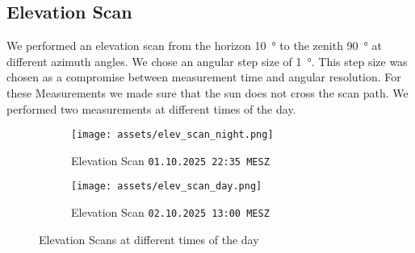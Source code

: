 \subsection{Elevation Scan}
We performed an elevation scan from the horizon \SI{10}{\degree} to the zenith \SI{90}{\degree} at different  azimuth angles.
We chose an angular step size of \SI{1}{\degree}. This step size was chosen as a compromise between measurement time and angular resolution.
For these Measurements we made sure that the sun does not cross the scan path. We performed two measurements at different times of the day.

\begin{figure}[H]
\centering
\begin{subfigure}[t]{0.45\textwidth}
    \centering
    \texttt{[image: assets/elev\_scan\_night.png]}
    \caption{Elevation Scan \texttt{01.10.2025 22:35 MESZ}}
\end{subfigure}
\begin{subfigure}[t]{0.45\textwidth}
    \centering
    \texttt{[image: assets/elev\_scan\_day.png]}
    \caption{Elevation Scan \texttt{02.10.2025 13:00 MESZ}}
\end{subfigure}
\caption{Elevation Scans at different times of the day}
\label{fig:elev_scan}
\end{figure}


%


